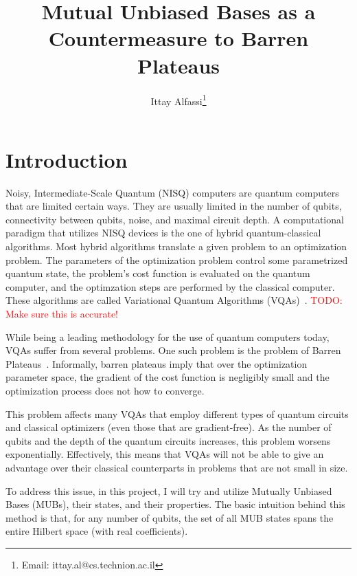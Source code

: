\documentclass[a4paper,12pt]{article}
\title{Mutual Unbiased Bases as a Countermeasure to Barren Plateaus}
\author{Ittay Alfassi\footnote{Email: ittay.al@cs.technion.ac.il}}
\newcommand{\mytodo}[1]{\textcolor{red}{TODO: #1}}
\begin{document}
\maketitle

\thispagestyle{fancy}

\tableofcontents

\section{Introduction}
Noisy, Intermediate-Scale Quantum (NISQ) computers are quantum computers that are limited certain ways. They are usually limited in the number of qubits, connectivity between qubits, noise, and maximal circuit depth.
A computational paradigm that utilizes NISQ devices is the one of hybrid quantum-classical algorithms.
Most hybrid algorithms translate a given problem to an optimization problem.
The parameters of the optimization problem control some parametrized quantum state, the problem's cost function is evaluated on the quantum computer, and the optimzation steps are performed by the classical computer. These algorithms are called Variational Quantum Algorithms (VQAs)~\cite{Cerezo2021}. \mytodo{Make sure this is accurate!}

While being a leading methodology for the use of quantum computers today, VQAs suffer from several problems. One such problem is the problem of Barren Plateaus~\cite{mcclean_barren_2018}. Informally, barren plateaus imply that over the optimization parameter space, the gradient of the cost function is negligibly small and the optimization process does not how to converge.

This problem affects many  VQAs that employ different types of quantum circuits and classical optimizers (even those that are gradient-free). As the number of qubits and the depth of the quantum circuits increases, this problem worsens exponentially.
Effectively, this means that VQAs will not be able to give an advantage over their classical counterparts in problems that are not small in size.

To address this issue, in this project, I will try and utilize Mutually Unbiased Bases (MUBs), their states, and their properties.
The basic intuition behind this method is that, for any number of qubits, the set of all MUB states spans the entire Hilbert space (with real coefficients).
\end{document}
